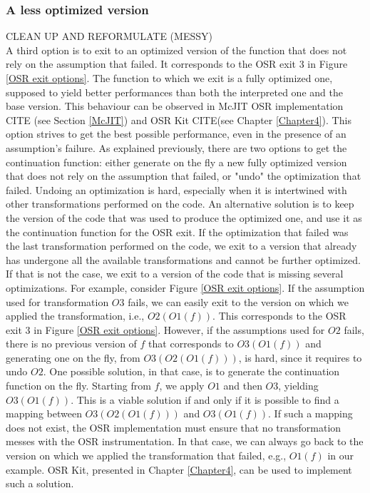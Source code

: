 \subsubsection{A less optimized version}
CLEAN UP AND REFORMULATE (MESSY)\\

A third option is to exit to an optimized version of the function that does not rely on the assumption that failed.
It corresponds to the OSR exit 3 in Figure \ref{OSR exit options}.
The function to which we exit is a fully optimized one, supposed to yield better performances than both the interpreted one and the base version.
This behaviour can be observed in McJIT OSR implementation CITE (see Section \ref{McJIT}) and OSR Kit CITE(see Chapter \ref{Chapter4}).
This option strives to get the best possible performance, even in the presence of an assumption's failure.
As explained previously, there are two options to get the continuation function: either generate on the fly a new fully optimized version that does not rely on the assumption that failed, or "undo" the optimization that failed.
Undoing an optimization is hard, especially when it is intertwined with other transformations performed on the code.
An alternative solution is to keep the version of the code that was used to produce the optimized one, and use it as the continuation function for the OSR exit.
If the optimization that failed was the last transformation performed on the code, we exit to a version that already has undergone all the available transformations and cannot be further optimized.
If that is not the case, we exit to a version of the code that is missing several optimizations.
For example, consider Figure \ref{OSR exit options}. 
If the assumption used for transformation $O3$ fails, we can easily exit to the version on which we applied the transformation, i.e., $O2(O1(f))$.
This corresponds to the OSR exit 3 in Figure \ref{OSR exit options}.
However, if the assumptions used for $O2$ fails, there is no previous version of $f$ that corresponds to $O3(O1(f))$ and generating one on the fly, from $O3(O2(O1(f)))$, is hard, since it requires to undo $O2$.
One possible solution, in that case, is to generate the continuation function on the fly.
Starting from $f$, we apply $O1$ and then $O3$, yielding $O3(O1(f))$.
This is a viable solution if and only if it is possible to find a mapping between $O3(O2(O1(f)))$ and $O3(O1(f))$.
If such a mapping does not exist, the OSR implementation must ensure that no transformation messes with the OSR instrumentation.
In that case, we can always go back to the version on which we applied the transformation that failed, e.g., $O1(f)$ in our example.
OSR Kit, presented in Chapter \ref{Chapter4}, can be used to implement such a solution.\\

